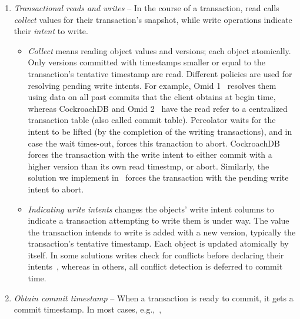 \begin{enumerate}
  \item \emph{Transactional reads and writes} -- 
 In the course of a transaction, read calls \emph{collect} values for their transaction's snapshot, 
 while write operations indicate their \emph{intent} to write. 
  	 	\begin{itemize}
  		\item  \emph{Collect} means reading object values  and versions; each object atomically. 
  		Only versions committed with timestamps  smaller or equal to the transaction's tentative timestamp are read. 
 		Different  policies are used for resolving pending write intents. For example, Omid 1~\cite{OmidICDE2014} resolves them 
 		using data on all past commits that the client obtains at begin time, whereas CockroachDB and Omid 2~\cite{omid-blog} 
 		have the read refer to a centralized transaction table (also called commit table). 
		Percolator  waits for the intent to be lifted (by the completion of the writing transactions), and in case the wait times-out, 
		forces this tranaction to abort. 
	 	 CockroachDB forces the transaction with the write intent to either commit with a higher version 
  		than its own read timestmp, or abort. Similarly, the solution we implement in \sys\ forces the transaction with the pending write 
  		intent to abort. 
  		\item \emph{Indicating write intents} changes the objects' write intent columns
  		to indicate a transaction attempting to write them is under way. The value the
  		transaction intends to write is added with a new version, typically the transaction's tentative timestamp.
		Each object is updated atomically by itself. 
		In some solutions writes check for conflicts before declaring their intents~\cite{cockroach}, whereas in others, 
		all conflict detection is deferred to commit time. 
  	\end{itemize}
  \item \emph{Obtain commit timestamp} --
  When a transaction is ready to commit, it gets a commit timestamp. In most cases, e.g.,~\cite{Percolator2010,tephra,OmidICDE2014,omid-blog}, 

\end{enumerate}
